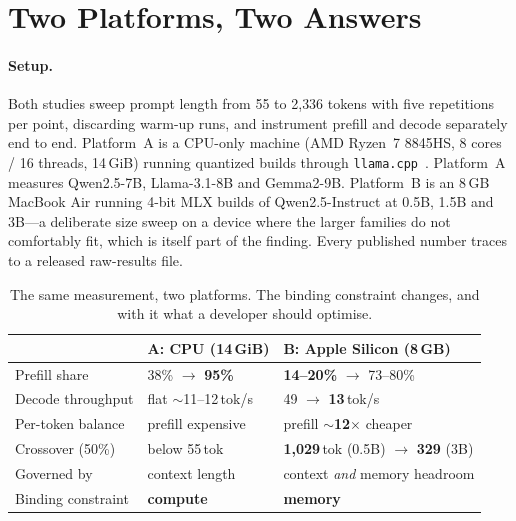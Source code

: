 \documentclass[sigconf,nonacm,10pt]{acmart}
\begin{document}
\section{Two Platforms, Two Answers}
\label{sec:two}

\paragraph{Setup.} Both studies sweep prompt length from 55 to 2{,}336 tokens with five repetitions per point,
discarding warm-up runs, and instrument prefill and decode separately end to end. Platform~A is a CPU-only
machine (AMD Ryzen~7 8845HS, 8 cores / 16 threads, 14\,GiB) running quantized builds through
\texttt{llama.cpp}~\cite{gerganov2023llamacpp}. Platform~A measures Qwen2.5-7B, Llama-3.1-8B and Gemma2-9B.
Platform~B is an 8\,GB MacBook Air running 4-bit MLX builds of Qwen2.5-Instruct at 0.5B, 1.5B and 3B---a
deliberate size sweep on a device where the larger families do not comfortably fit, which is itself part of the
finding. Every published number traces to a released raw-results file.

\begin{table}[t]
\caption{The same measurement, two platforms. The binding constraint changes, and with it what a developer
should optimise.}
\label{tab:contrast}
\small
\begin{tabular}{@{}lll@{}}
\toprule
 & \textbf{A: CPU (14\,GiB)} & \textbf{B: Apple Silicon (8\,GB)} \\
\midrule
Prefill share      & 38\% $\rightarrow$ \textbf{95\%} & \textbf{14--20\%} $\rightarrow$ 73--80\% \\
Decode throughput  & flat $\sim$11--12\,tok/s          & 49 $\rightarrow$ \textbf{13}\,tok/s \\
Per-token balance  & prefill expensive                 & prefill $\sim$\textbf{12$\times$} cheaper \\
Crossover (50\%)   & below 55\,tok                     & \textbf{1{,}029}\,tok (0.5B) $\rightarrow$ \textbf{329} (3B) \\
Governed by        & context length                    & context \emph{and} memory headroom \\
Binding constraint & \textbf{compute}                  & \textbf{memory} \\
\bottomrule
\end{tabular}
\end{table}
\end{document}
